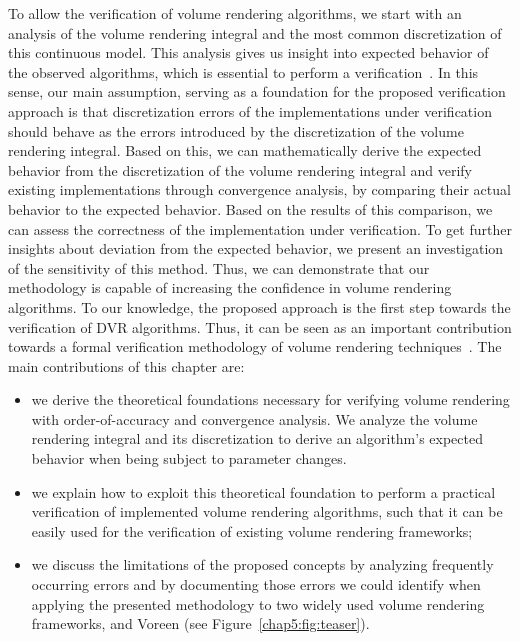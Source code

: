 To allow the verification of volume rendering algorithms, we start with an analysis of the volume rendering integral and the most common discretization of this continuous model. This analysis gives us insight into expected behavior of the observed algorithms, which is essential to perform a verification~\cite{159342}. In this sense, our main assumption, serving as a foundation for the proposed verification approach is that discretization errors of the implementations under verification should behave as the errors introduced by 
the discretization of the volume rendering integral. 
Based on this, we can mathematically derive the expected behavior from the discretization of the volume rendering integral and verify existing implementations through convergence analysis, by comparing their actual behavior to the expected behavior. 
Based on the results of this comparison, we can assess the correctness of the implementation under verification. To get further insights about deviation from the expected behavior, we present an investigation of the sensitivity of this method. 
Thus, we can demonstrate that our methodology is capable of increasing the confidence in volume rendering algorithms. To our knowledge, the proposed approach is the first step towards the verification of DVR algorithms. Thus, it can be seen as an important contribution towards a formal verification methodology of volume rendering techniques~\cite{roach98}.
The main contributions of this chapter are:
\begin{itemize}
\item we derive the theoretical foundations necessary for verifying volume rendering with order-of-accuracy and convergence analysis. We analyze the volume rendering integral and its discretization to derive an algorithm's expected behavior when being subject to parameter changes.
\item we explain how to exploit this theoretical foundation to perform a practical verification of implemented volume rendering algorithms, such that it can be easily used for the verification of existing volume rendering frameworks;
\item we discuss the limitations of the proposed concepts by analyzing frequently occurring errors and by documenting those errors we could identify when applying the presented methodology to two widely used volume rendering frameworks, 
 \cite{vtk} and Voreen \cite{MRMH09} (see Figure~\ref{chap5:fig:teaser}).
\end{itemize}

